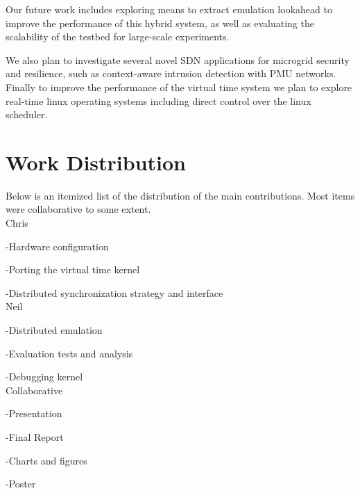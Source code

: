 Our future work includes
exploring means to extract emulation lookahead to improve
the performance of this hybrid system, as well as evaluating the scalability of the testbed for large-scale experiments. 

We also plan to investigate several novel SDN
applications for microgrid security and resilience, such as context-aware intrusion detection with PMU networks. Finally to improve the performance of the virtual time system we plan to explore real-time linux operating systems including direct control over the linux scheduler.

\section{Work Distribution}
Below is an itemized list of the distribution of the main contributions. Most items were collaborative to some extent.
\\
Chris

-Hardware configuration

-Porting the virtual time kernel

-Distributed synchronization strategy and interface
\\
Neil

-Distributed emulation

-Evaluation tests and analysis

-Debugging kernel
\\
Collaborative

-Presentation

-Final Report

-Charts and figures

-Poster
